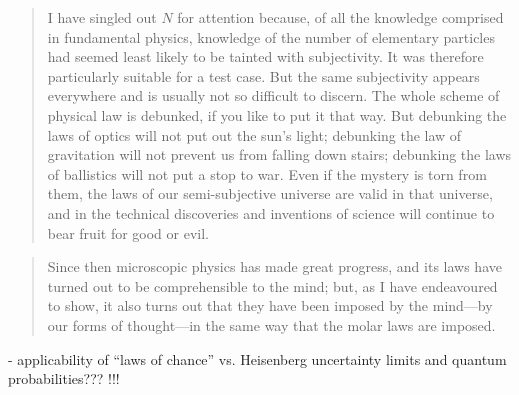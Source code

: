 \begin{quote}
    I have singled out $N$ for attention because, of all the knowledge comprised in fundamental physics, knowledge of the number of elementary particles had seemed least likely to be tainted with subjectivity.  It was therefore particularly suitable for a test case.  But the same subjectivity appears everywhere and is usually not so difficult to discern.  The whole scheme of physical law is debunked, if you like to put it that way.  But debunking the laws of optics will not put out the sun's light; debunking the law of gravitation will not prevent us from falling down stairs; debunking the laws of ballistics will not put a stop to war.  Even if the mystery is torn from them, the laws of our semi-subjective universe are valid in that universe, and in the technical discoveries and inventions of science will continue to bear fruit for good or evil.  \citep[p. 178]{Eddington1939}
\end{quote}



\begin{quote}
    Since then microscopic physics has made great progress, and its laws have turned out to be comprehensible to the mind; but, as I have endeavoured to show, it also turns out that they have been imposed by the mind---by our forms of thought---in the same way that the molar laws are imposed. \citep[p. 180]{Eddington1939}
\end{quote}



- applicability of ``laws of chance'' vs. Heisenberg uncertainty limits and quantum probabilities??? !!!

